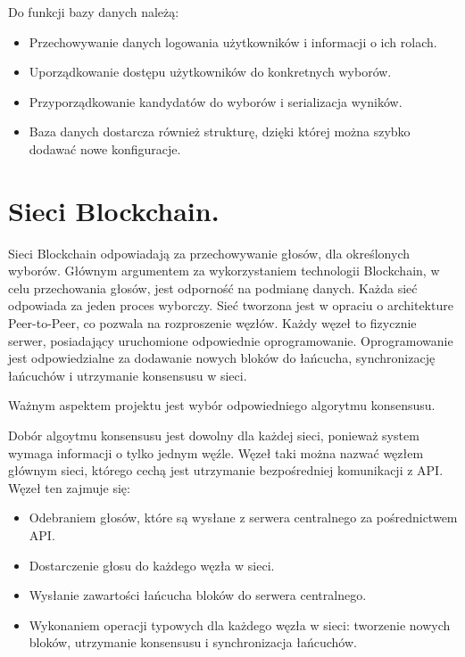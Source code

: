 \documentclass[a4paper,13pt]{report}
\begin{document}
Do funkcji bazy danych należą:
\begin{itemize}
    \item Przechowywanie danych logowania użytkowników i informacji o ich rolach.
    \item Uporządkowanie dostępu użytkowników do konkretnych wyborów.
    \item Przyporządkowanie kandydatów do wyborów i serializacja wyników.
    \item Baza danych dostarcza również strukturę, dzięki której można szybko dodawać nowe konfiguracje.
\end{itemize}

\section {Sieci Blockchain.}

Sieci Blockchain odpowiadają za przechowywanie głosów, dla określonych wyborów. Głównym argumentem za wykorzystaniem technologii Blockchain, w celu przechowania głosów, jest odporność na podmianę danych. Każda sieć odpowiada za jeden proces wyborczy. Sieć tworzona jest w opraciu o architekture Peer-to-Peer, co pozwala na rozproszenie węzłów.  Każdy węzeł to fizycznie serwer, posiadający uruchomione odpowiednie oprogramowanie. Oprogramowanie jest odpowiedzialne za dodawanie nowych bloków do łańcucha, synchronizację łańcuchów i utrzymanie konsensusu w sieci. 

Ważnym aspektem projektu jest wybór odpowiedniego algorytmu konsensusu. 

Dobór algoytmu konsensusu jest dowolny dla każdej sieci, ponieważ system wymaga informacji o tylko jednym węźle. Węzeł taki można nazwać węzłem głównym sieci, którego cechą jest utrzymanie bezpośredniej komunikacji z API. Węzeł ten zajmuje się:
\begin{itemize}
	\item Odebraniem głosów, które są wysłane z serwera centralnego za pośrednictwem API.
	\item Dostarczenie głosu do każdego węzła w sieci.
	\item Wysłanie zawartości łańcucha bloków do serwera centralnego.
	\item Wykonaniem operacji typowych dla każdego węzła w sieci: tworzenie nowych bloków, utrzymanie konsensusu i synchronizacja łańcuchów.
\end{itemize}
\end{document}
